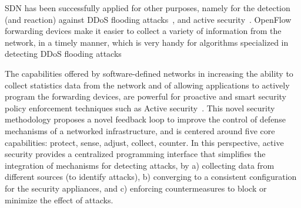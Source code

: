 SDN has been successfully applied for other purposes, namely for the detection (and reaction) against DDoS flooding attacks~\cite{braga2010-1}, and active security~\cite{hand2013}.
OpenFlow forwarding devices make it easier to collect a variety of information from the network, in a timely 
manner, which is very handy for algorithms specialized in detecting DDoS flooding attacks

The capabilities offered by software-defined networks in increasing the ability to collect statistics data from the network and of allowing applications to actively program the forwarding devices, are powerful for proactive and smart 
security policy enforcement techniques such as Active security~\cite{hand2013}.
This novel security methodology proposes a novel feedback loop to improve the control of defense mechanisms 
of a networked infrastructure, and is centered around five core capabilities: protect, sense, 
adjust, collect, counter.
In this perspective, active security provides a centralized programming interface that simplifies the integration of mechanisms for detecting attacks, by
a) collecting data from different sources (to identify attacks), 
b) converging to a consistent configuration for the security appliances, and 
c) enforcing countermeasures to block or minimize the effect of attacks.

%

